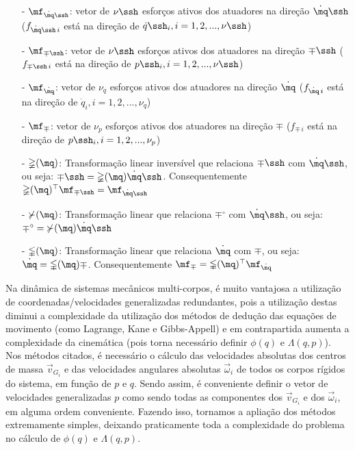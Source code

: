 \begin{itemize}
\item[-]$\mf_{\dot{\mq}\ssh}$: vetor de $\nu\ssh$ esfor\c{c}os ativos dos atuadores na dire\c{c}\~ao $\dot{\mq}\ssh$ ($f_{\dot{\mq}\ssh \, i}$ est\'a na dire\c{c}\~ao de $\dot{q}\ssh_i, i = 1,2,...,\nu\ssh$)
\item[-]$\mf_{\mp\ssh}$: vetor de $\nu\ssh$ esfor\c{c}os ativos dos atuadores na dire\c{c}\~ao $\mp\ssh$ ($f_{\mp\ssh \, i}$ est\'a na dire\c{c}\~ao de $p\ssh_i, i = 1,2,...,\nu\ssh$)
\item[-]$\mf_{\dot{\mq}}$: vetor de $\nu_q$ esfor\c{c}os ativos dos atuadores na dire\c{c}\~ao $\dot{\mq}$ ($f_{\dot{\mq} \, i}$ est\'a na dire\c{c}\~ao de $\dot{q}_i, i = 1,2,...,\nu_q$)
\item[-]$\mf_{\mp}$: vetor de $\nu_p$ esfor\c{c}os ativos dos atuadores na dire\c{c}\~ao $\mp$ ($f_{\mp \, i}$ est\'a na dire\c{c}\~ao de $p\ssh_i, i = 1,2,...,\nu_p$)
\item[-]$\mathbb{\Psi}(\mq)$: Transformação linear inversível que relaciona $\mp\ssh$ com $\dot{\mq}\ssh$, ou seja: $\mp\ssh = \mathbb{\Psi}(\mq) \dot{\mq}\ssh$. Consequentemente $\mathbb{\Psi}(\mq)^\top \mf_{\mp\ssh} = \mf_{\dot{\mq}\ssh} $
\item[-]$\mathbb{\Upsilon}(\mq)$: Transformação linear que relaciona $\mp^\circ$ com $\dot{\mq}\ssh$, ou seja: $\mp^\circ = \mathbb{\Upsilon}(\mq) \dot{\mq}\ssh$
\item[-]$\mathbb{\Gamma}(\mq)$: Transformação linear que relaciona $\dot{\mq}$ com $\mp$, ou seja: $ \dot{\mq} = \mathbb{\Gamma}(\mq) \mp $. Consequentemente $ \mf_{\mp} = \mathbb{\Gamma}(\mq)^\top \mf_{\dot{\mq}}$
\end{itemize}

Na dinâmica de sistemas mecânicos multi-corpos, é muito vantajosa a utilização de coordenadas/velocidades generalizadas redundantes, pois a utilização destas diminui a complexidade da utilização dos métodos de dedução das equações de movimento (como Lagrange, Kane e Gibbs-Appell) e em contrapartida aumenta a complexidade da cinemática (pois torna necessário definir $\phi(q)$ e $\Lambda(q,p)$). \\

Nos métodos citados, é necessário o cálculo das velocidades absolutas dos centros de massa $\vec{v}_{G_i}$ e das velocidades angulares absolutas $\vec{\omega}_i$ de todos os corpos rígidos do sistema, em função de $p$ e $q$. Sendo assim, é conveniente definir o vetor de velocidades generalizadas $p$ como sendo todas as componentes dos $\vec{v}_{G_i}$ e dos $\vec{\omega}_i$, em alguma ordem conveniente. Fazendo isso, tornamos a apliação dos métodos extremamente simples, deixando praticamente toda a complexidade do problema no cálculo de $\phi(q)$ e $\Lambda(q,p)$. \\

